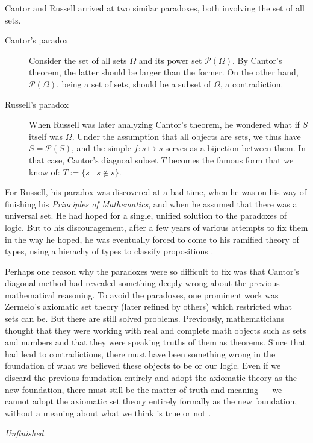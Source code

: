 \documentclass[10pt]{article}
\begin{document}
Cantor and Russell arrived at two similar paradoxes, both involving the set of
all sets.
\begin{description}
	\item[Cantor's paradox] Consider the set of all sets $\Omega$ and its
		power set $\mathcal{P}(\Omega)$. By Cantor's theorem, the latter should
		be larger than the former. On the other hand, $\mathcal{P}(\Omega)$,
		being a set of sets, should be a subset of $\Omega$, a contradiction.
	\item [Russell's paradox] When Russell was later analyzing Cantor's
		theorem, he wondered what if $S$ itself was $\Omega$. Under the
		assumption that all objects are sets, we thus have $S =
		\mathcal{P}(S)$, and the simple $f: s \mapsto s$ serves as a bijection
		between them. In that case, Cantor's diagnoal subset $T$ becomes the
		famous form that we know of: $T := \{s \mid s \notin s \}$.
\end{description}

For Russell, his paradox was discovered at a bad time, when he was on his way
of finishing his \emph{Principles of Mathematics}, and when he assumed that
there was a universal set. He had hoped for a single, unified solution to the
paradoxes of logic. But to his discouragement, after a few years of various
attempts to fix them in the way he hoped, he was eventually forced to come to
his ramified theory of types, using a hierachy of types to classify
propositions \cite{companion.to.russell.tt}.

Perhaps one reason why the paradoxes were so difficult to fix was that Cantor's
diagonal method had revealed something deeply wrong about the previous
mathematical reasoning. To avoid the paradoxes, one prominent work was
Zermelo's axiomatic set theory (later refined by others) which restricted what
sets can be. But there are still solved problems. Previously, mathematicians
thought that they were working with real and complete math objects such as sets
and numbers and that they were speaking truths of them as theorems. Since that
had lead to contradictions, there must have been something wrong in the
foundation of what we believed these objects to be or our logic. Even if we
discard the previous foundation entirely and adopt the axiomatic theory as the
new foundation, there must still be the matter of truth and meaning --- we
cannot adopt the axiomatic set theory entirely formally as the new foundation,
without a meaning about what we think is true or not \cite[Ch.~12]{kleeneitmm}.

\emph{Unfinished.}



\end{document}
